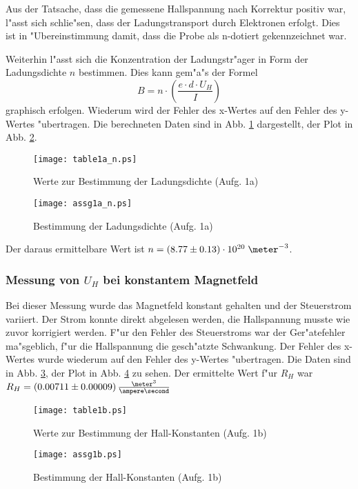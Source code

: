\documentclass[a4paper,10pt]{article}
\begin{document}
Aus der Tatsache, dass die gemessene Hallspannung nach Korrektur positiv war, l"asst sich schlie"sen, dass der Ladungstransport durch Elektronen erfolgt. Dies ist in "Ubereinstimmung damit, dass die Probe als n-dotiert gekennzeichnet war.

Weiterhin l"asst sich die Konzentration der Ladungstr"ager in Form der Ladungsdichte $n$ bestimmen. Dies kann gem"a"s der Formel
\begin{equation}
B = n \cdot \left( \frac{e \cdot d \cdot U_H}{I} \right)
\end{equation}
graphisch erfolgen. Wiederum wird der Fehler des x-Wertes auf den Fehler des y-Wertes "ubertragen. Die berechneten Daten sind in Abb. \ref{table1a_n} dargestellt, der Plot in Abb. \ref{plot1a_n}.
\begin{figure}[p]
    \centering
    \texttt{[image: table1a\_n.ps]}
\caption{Werte zur Bestimmung der Ladungsdichte (Aufg. 1a)}
\label{table1a_n}
\end{figure}
\begin{figure}[p]
    \centering
         \texttt{[image: assg1a\_n.ps]}
         \caption{Bestimmung der Ladungsdichte (Aufg. 1a)}
       \label{plot1a_n}
\end{figure}
Der daraus ermittelbare Wert ist $n = (8.77 \pm 0.13) \cdot 10^{20}\; \meter^{-3}$.

\subsubsection*{Messung von $U_H$ bei konstantem Magnetfeld}
Bei dieser Messung wurde das Magnetfeld konstant gehalten und der Steuerstrom variiert. Der Strom konnte direkt abgelesen werden, die Hallspannung musste wie zuvor korrigiert werden. F"ur den Fehler des Steuerstroms war der Ger"atefehler ma"sgeblich, f"ur die Hallspannung die gesch"atzte Schwankung. Der Fehler des x-Wertes wurde wiederum auf den Fehler des y-Wertes "ubertragen. Die Daten sind in Abb. \ref{table1b}, der Plot in Abb. \ref{plot1b} zu sehen. Der ermittelte Wert f"ur $R_H$ war $R_H = (0.00711 \pm 0.00009) \, \frac{\meter^3}{\ampere \second}$
\begin{figure}[p]
    \centering
    \texttt{[image: table1b.ps]}
\caption{Werte zur Bestimmung der Hall-Konstanten (Aufg. 1b)}
\label{table1b}
\end{figure}
\begin{figure}[p]
    \centering
         \texttt{[image: assg1b.ps]}
         \caption{Bestimmung der Hall-Konstanten (Aufg. 1b)}
       \label{plot1b}
\end{figure}
\end{document}
